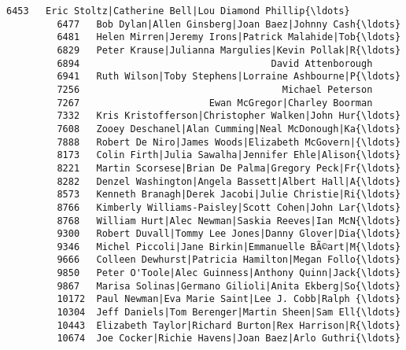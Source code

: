 \documentclass[11pt]{article}
\begin{document}
\begin{Verbatim}[commandchars=\\\{\}]
         6453   Eric Stoltz|Catherine Bell|Lou Diamond Phillip{\ldots}   
         6477   Bob Dylan|Allen Ginsberg|Joan Baez|Johnny Cash{\ldots}   
         6481   Helen Mirren|Jeremy Irons|Patrick Malahide|Tob{\ldots}   
         6829   Peter Krause|Julianna Margulies|Kevin Pollak|R{\ldots}   
         6894                                  David Attenborough   
         6941   Ruth Wilson|Toby Stephens|Lorraine Ashbourne|P{\ldots}   
         7256                                    Michael Peterson   
         7267                       Ewan McGregor|Charley Boorman   
         7332   Kris Kristofferson|Christopher Walken|John Hur{\ldots}   
         7608   Zooey Deschanel|Alan Cumming|Neal McDonough|Ka{\ldots}   
         7888   Robert De Niro|James Woods|Elizabeth McGovern|{\ldots}   
         8173   Colin Firth|Julia Sawalha|Jennifer Ehle|Alison{\ldots}   
         8221   Martin Scorsese|Brian De Palma|Gregory Peck|Fr{\ldots}   
         8282   Denzel Washington|Angela Bassett|Albert Hall|A{\ldots}   
         8573   Kenneth Branagh|Derek Jacobi|Julie Christie|Ri{\ldots}   
         8766   Kimberly Williams-Paisley|Scott Cohen|John Lar{\ldots}   
         8768   William Hurt|Alec Newman|Saskia Reeves|Ian McN{\ldots}   
         9300   Robert Duvall|Tommy Lee Jones|Danny Glover|Dia{\ldots}   
         9346   Michel Piccoli|Jane Birkin|Emmanuelle BÃ©art|M{\ldots}   
         9666   Colleen Dewhurst|Patricia Hamilton|Megan Follo{\ldots}   
         9850   Peter O'Toole|Alec Guinness|Anthony Quinn|Jack{\ldots}   
         9867   Marisa Solinas|Germano Gilioli|Anita Ekberg|So{\ldots}   
         10172  Paul Newman|Eva Marie Saint|Lee J. Cobb|Ralph {\ldots}   
         10304  Jeff Daniels|Tom Berenger|Martin Sheen|Sam Ell{\ldots}   
         10443  Elizabeth Taylor|Richard Burton|Rex Harrison|R{\ldots}   
         10674  Joe Cocker|Richie Havens|Joan Baez|Arlo Guthri{\ldots}   
         

\end{Verbatim}
\end{document}

